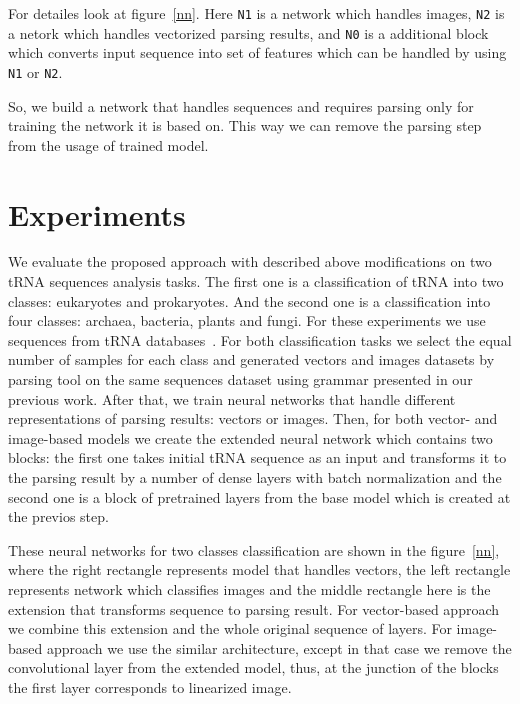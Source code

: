 \documentclass[12pt,a4paper]{cibb}
\begin{document}
For detailes look at figure~\ref{nn}. Here \texttt{N1} is a network which handles images, \texttt{N2} is a netork which handles vectorized parsing results, and \texttt{N0} is a additional block which converts input sequence into set of features which can be handled by using \texttt{N1} or \texttt{N2}.

So, we build a network that handles sequences and requires parsing only for training the network it is based on.
This way we can remove the parsing step from the usage of trained model.


\section{\bf Experiments}

We evaluate the proposed approach with described above modifications on two tRNA sequences analysis tasks.
The first one is a classification of tRNA into two classes: eukaryotes and prokaryotes.
And the second one is a classification into four classes: archaea, bacteria, plants and fungi.
For these experiments we use sequences from tRNA databases~\cite{trnadb1,trnadb2}.
For both classification tasks we select the equal number of samples for each class and generated vectors and images datasets by parsing tool on the same sequences dataset using grammar presented in our previous work.
After that, we train neural networks that handle different representations of parsing results: vectors or images.
Then, for both vector- and image-based models we create the extended neural network which contains two blocks: the first one takes initial tRNA sequence as an input and transforms it to the parsing result by a number of dense layers with batch normalization and the second one is a block of pretrained layers from the base model which is created at the previos step.

These neural networks for two classes classification are shown in the figure~\ref{nn}, where the right rectangle represents model that handles vectors, the left rectangle represents network which classifies images and the middle rectangle here is the extension that transforms sequence to parsing result. For vector-based approach we combine this extension and the whole original sequence of layers.
For image-based approach we use the similar architecture, except in that case we remove the convolutional layer from the extended model, thus, at the junction of the blocks the first layer corresponds to linearized image.
\end{document}
